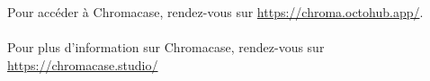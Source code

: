 Pour accéder à Chromacase, rendez-vous sur \url{https://chroma.octohub.app/}.
\\\\
Pour plus d’information sur Chromacase, rendez-vous sur \url{https://chromacase.studio/}
